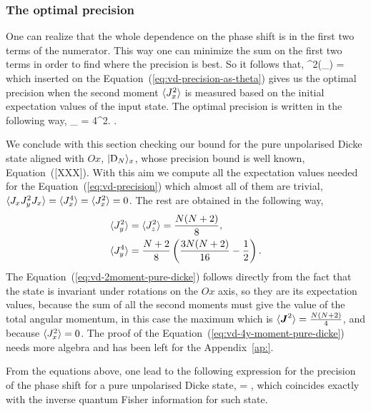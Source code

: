 {\subsubsection{The optimal precision}
One can realize that the whole dependence on the phase shift is in the first two terms of the numerator.
This way one can minimize the sum on the first two terms in order to find where the precision is best.
So it follows that,
\be
  \tan^2(\Theta_{}) = 
\ee
which inserted on the Equation~{(\ref{eq:vd-precision-as-theta})} gives us the optimal precision when the second moment $\langle J_x^2 \rangle$ is measured based on the initial expectation values of the input state. The optimal precision is written in the following way,
\be
  \varian{\Theta}_{} = 
  {4^2}.
  \label{eq:vd-precision}
\ee.

We conclude with this section checking our bound for the pure unpolarised Dicke state aligned with $Ox$, $\vert \text{D}_N \rangle_x$, whose precision bound is well known, Equation~{([XXX])}.
With this aim we compute all the expectation values needed for the Equation~{(\ref{eq:vd-precision})} which almost all of them are trivial, $\langle J_xJ_y^2J_x \rangle=\langle J_x^4 \rangle=\langle J_x^2 \rangle=0$.
The rest are obtained in the following way,
\begin{align}
  \langle J_y^2 \rangle & = \langle J_z^2 \rangle = \frac{N (N+2)}{8},
  \label{eq:vd-2moment-pure-dicke}\\
  \langle J_y^4 \rangle & = \frac{N+2}{8}\left(\frac{3N(N+2)}{16}-\frac{1}{2}\right).
  \label{eq:vd-4y-moment-pure-dicke}
\end{align}
The Equation~{(\ref{eq:vd-2moment-pure-dicke})} follows directly from the fact that the state is invariant under rotations on the $Ox$ axis, so they are its expectation values, because the sum of all the second moments must give the value of the total angular momentum, in this case the maximum which is $\langle \boldsymbol{J}^2 \rangle = \frac{N (N+2)}{4}$, and because $\langle J_x^2 \rangle=0$.
The proof of the Equation~{(\ref{eq:vd-4y-moment-pure-dicke})} needs more algebra and has been left for the Appendix~{\ref{ap:}}.

From the equations above, one lead to the following expression for the precision of the phase shift for a pure unpolarised Dicke state,
\be
  \varian{\Theta} = ,
\ee
which coincides exactly with the inverse quantum Fisher information for such state.

}
